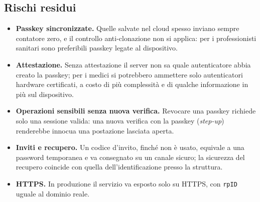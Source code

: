 \subsection{Rischi residui}
\begin{itemize}
  \item \textbf{Passkey sincronizzate.} Quelle salvate nel cloud spesso inviano sempre contatore zero, e il controllo anti-clonazione non si applica: per i professionisti sanitari sono preferibili passkey legate al dispositivo.
  \item \textbf{Attestazione.} Senza attestazione il server non sa quale autenticatore abbia creato la passkey; per i medici si potrebbero ammettere solo autenticatori hardware certificati, a costo di più complessità e di qualche informazione in più sul dispositivo.
  \item \textbf{Operazioni sensibili senza nuova verifica.} Revocare una passkey richiede solo una sessione valida: una nuova verifica con la passkey (\emph{step-up}) renderebbe innocua una postazione lasciata aperta.
  \item \textbf{Inviti e recupero.} Un codice d'invito, finché non è usato, equivale a una password temporanea e va consegnato su un canale sicuro; la sicurezza del recupero coincide con quella dell'identificazione presso la struttura.
  \item \textbf{HTTPS.} In produzione il servizio va esposto solo su HTTPS, con \texttt{rpID} uguale al dominio reale.
\end{itemize}
